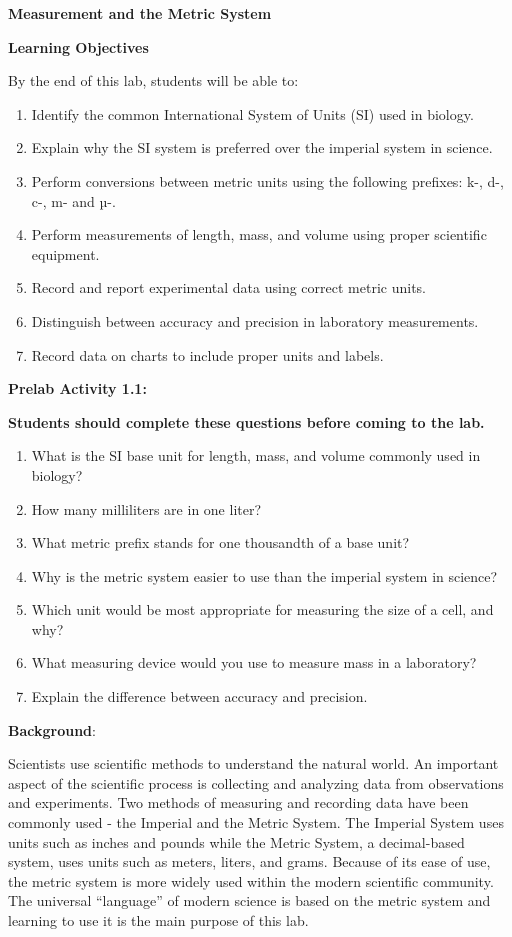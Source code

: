 \documentclass[
  letterpaper,
  DIV=11,
  numbers=noendperiod]{scrreprt}
\begin{document}
\textbf{Measurement and the Metric System}

\textbf{Learning Objectives}

By the end of this lab, students will be able to:

\begin{enumerate}
\def\labelenumi{\arabic{enumi}.}
\item
  Identify the common International System of Units (SI) used in
  biology.
\item
  Explain why the SI system is preferred over the imperial system in
  science.
\item
  Perform conversions between metric units using the following prefixes:
  k-, d-, c-, m- and µ-.
\item
  Perform measurements of length, mass, and volume using proper
  scientific equipment.
\item
  Record and report experimental data using correct metric units.
\item
  Distinguish between accuracy and precision in laboratory measurements.
\item
  Record data on charts to include proper units and labels.
\end{enumerate}

\textbf{Prelab Activity 1.1:}

\textbf{Students should complete these questions before coming to the
lab.}

\begin{enumerate}
\def\labelenumi{\arabic{enumi}.}
\item
  What is the SI base unit for length, mass, and volume commonly used in
  biology?
\item
  How many milliliters are in one liter?
\item
  What metric prefix stands for one thousandth of a base unit?
\item
  Why is the metric system easier to use than the imperial system in
  science?
\item
  Which unit would be most appropriate for measuring the size of a cell,
  and why?
\item
  What measuring device would you use to measure mass in a laboratory?
\item
  Explain the difference between accuracy and precision.
\end{enumerate}

\textbf{Background}:

Scientists use scientific methods to understand the natural world. An
important aspect of the scientific process is collecting and analyzing
data from observations and experiments. Two methods of measuring and
recording data have been commonly used - the Imperial and the Metric
System. The Imperial System uses units such as inches and pounds while
the Metric System, a decimal-based system, uses units such as meters,
liters, and grams. Because of its ease of use, the metric system is more
widely used within the modern scientific community. The universal
``language'' of modern science is based on the metric system and
learning to use it is the main purpose of this lab.
\end{document}

